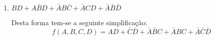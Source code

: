 \documentclass{article}
\begin{document}
\begin{resolution}
\begin{enumerate}[label=(\alph*), rightmargin = \leftmargin]
                    \item $BD + A\bar{B}D + \bar{A}B\bar{C} + \bar{A}CD + \bar{A}\bar{B}\bar{D}$
                        \begin{figure}[H]
                            \centering%
                            \begin{karnaugh-map}[4][4][1][$A\;B$][$C\;D$]
                            \end{karnaugh-map}
                        \end{figure}\noindent
                    Desta forma tem-se a seguinte simplificação:
                        \begin{equation}
                            \boxed{
                                f(A,B,C,D) = AD + \bar{C}\bar{D} + \bar{A}\bar{B}C + \bar{A}BC + \bar{A}\bar{C}\bar{D}
                            }
                        \end{equation}
                \end{enumerate}
            \end{resolution}
\newpage
\end{document}
